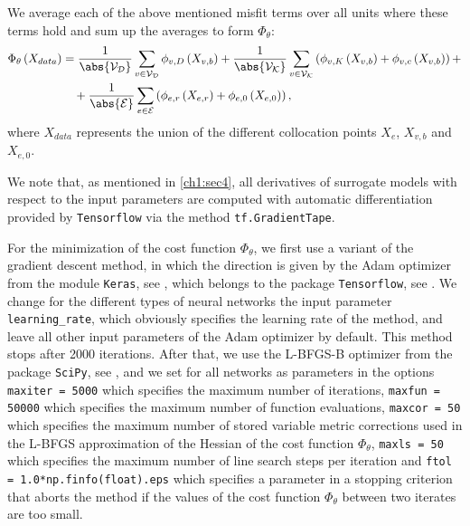 We average each of the above mentioned misfit terms over all units where these terms hold and sum up the averages to form $\Phi_\theta$:
\begin{align} 
    \label{eq:loss:1}
    \Phi_{\theta} \left( X_{data} \right) & =  \frac{1}{\abs{\mathcal{V}_\mathcal{D}}} \sum_{v \in \mathcal{V}_\mathcal{D}} \phi_{v,D} \left( X_{v,b} \right) + \frac{1}{\abs{\mathcal{V}_\mathcal{K}}} \sum_{v \in \mathcal{V}_\mathcal{K}}  \left(  \phi_{v,K}  \left( X_{v,b} \right) + \phi_{v,c} \left( X_{v,b} \right)  \right) + \\
    & \quad + \frac{1}{\abs{\mathcal{E}}} \sum_{e \in \mathcal{E}}  \left(  \phi_{e,r}  \left( X_{e,r} \right) + \phi_{e,0}  \left( X_{e,0} \right)  \right), 
\end{align}
where $X_{data}$ represents the union of the different collocation points $X_e$, $X_{v,b}$ and $X_{e,0}$. 

We note that, as mentioned in \cref{ch1:sec4}, all derivatives of surrogate models with respect to the input parameters are computed with automatic differentiation provided by \lstinline!Tensorflow! via the method \lstinline!tf.GradientTape!. 


For the minimization of the cost function $\Phi_{\theta}$, we first use a variant of the gradient descent method, in which the direction is given by the Adam optimizer from the module \lstinline!Keras!, see \cite{Chollet:2015}, which belongs to the package \lstinline!Tensorflow!, see \cite{TensorFlow}. We change for the different types of neural networks the input parameter \lstinline!learning_rate!, which obviously specifies the learning rate of the method, and leave all other input parameters of the Adam optimizer by default. This method stops after 2000 iterations. After that, we use the L-BFGS-B optimizer from the package \lstinline!SciPy!, see \cite{SciPy:2020}, and we set for all networks as parameters in the options \lstinline!maxiter = 5000! which specifies the maximum number of iterations, \lstinline!maxfun = 50000! which specifies the maximum number of function evaluations, \lstinline!maxcor = 50! which specifies the maximum number of stored variable metric corrections used in the L-BFGS approximation of the Hessian of the cost function $\Phi_{\theta}$, \lstinline!maxls = 50! which specifies the maximum number of line search steps per iteration and \lstinline!ftol = 1.0*np.finfo(float).eps! which specifies a parameter in a stopping criterion that aborts the method if the values of the cost function $\Phi_{\theta}$ between two iterates are too small.



